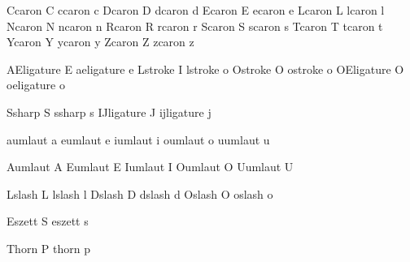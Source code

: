   \inheritprotrudefactor Ccaron C
  \inheritprotrudefactor ccaron c
  \inheritprotrudefactor Dcaron D
  \inheritprotrudefactor dcaron d
  \inheritprotrudefactor Ecaron E
  \inheritprotrudefactor ecaron e
  \inheritprotrudefactor Lcaron L
  \inheritprotrudefactor lcaron l
  \inheritprotrudefactor Ncaron N
  \inheritprotrudefactor ncaron n
  \inheritprotrudefactor Rcaron R
  \inheritprotrudefactor rcaron r
  \inheritprotrudefactor Scaron S
  \inheritprotrudefactor scaron s
  \inheritprotrudefactor Tcaron T
  \inheritprotrudefactor tcaron t
  \inheritprotrudefactor Ycaron Y
  \inheritprotrudefactor ycaron y
  \inheritprotrudefactor Zcaron Z
  \inheritprotrudefactor zcaron z
  
  \inheritprotrudefactor AEligature E
  \inheritprotrudefactor aeligature e
  \inheritprotrudefactor Lstroke    I
  \inheritprotrudefactor lstroke    o
  \inheritprotrudefactor Ostroke    O
  \inheritprotrudefactor ostroke    o
  \inheritprotrudefactor OEligature O
  \inheritprotrudefactor oeligature o
  
  \inheritprotrudefactor Ssharp     S
  \inheritprotrudefactor ssharp     s
  \inheritprotrudefactor IJligature J
  \inheritprotrudefactor ijligature j
  
  \inheritprotrudefactor aumlaut a
  \inheritprotrudefactor eumlaut e
  \inheritprotrudefactor iumlaut i
  \inheritprotrudefactor oumlaut o
  \inheritprotrudefactor uumlaut u
  
  \inheritprotrudefactor Aumlaut A
  \inheritprotrudefactor Eumlaut E
  \inheritprotrudefactor Iumlaut I
  \inheritprotrudefactor Oumlaut O
  \inheritprotrudefactor Uumlaut U
  
  \inheritprotrudefactor Lslash L 
  \inheritprotrudefactor lslash l
  \inheritprotrudefactor Dslash D
  \inheritprotrudefactor dslash d 
  \inheritprotrudefactor Oslash O 
  \inheritprotrudefactor oslash o 
  
  \inheritprotrudefactor Eszett S 
  \inheritprotrudefactor eszett s 
  
  \inheritprotrudefactor Thorn P
  \inheritprotrudefactor thorn p

\stopfonthandling

\unprotect 




